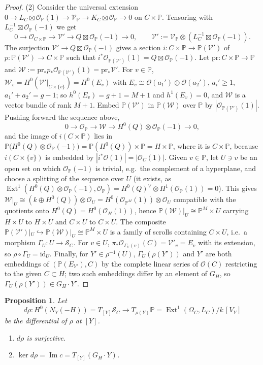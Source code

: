 \documentclass[11pt,reqno]{amsart}
\theoremstyle{plain}
\newtheorem{proposition}[theorem]{Proposition}
\theoremstyle{definition}
\newcommand{\PP}{\mathbb{P}}
\newcommand{\PM}{\mathbb{P}^M}
\newcommand{\OO}{\mathcal{O}}
\newcommand{\Ext}{\operatorname{Ext}}
\renewcommand{\Im}{\operatorname{Im}}
\newcommand{\id}{\mathrm{id}}
\newcommand{\NY}{N_{Y}}
\newcommand{\SC}{\mathcal{S}_C}
\newcommand{\GH}{G_H}
\begin{document}
\begin{proof}
(2) Consider the universal extension $0\to L_C\boxtimes\OO_{\PP}(1)\to\mathcal{V}_{\PP}\to K_C\boxtimes\OO_{\PP}\to0$ on $C\times\PP$. Tensoring with $L_C^{-1}\boxtimes\OO_{\PP}(-1)$ we get
\[
0\to\OO_{C\times\PP}\to\mathcal{V}'\to Q\boxtimes\OO_{\PP}(-1)\to0,\qquad \mathcal{V}':=\mathcal{V}_{\PP}\otimes(L_C^{-1}\boxtimes\OO_{\PP}(-1)).
\]
The surjection $\mathcal{V}'\to Q\boxtimes\OO_{\PP}(-1)$ gives a section $i\colon C\times\PP\to\PP(\mathcal{V}')$ of $p\colon\PP(\mathcal{V}')\to C\times\PP$ such that $i^*\OO_{\PP(\mathcal{V}')}(1)=Q\boxtimes\OO_{\PP}(-1)$. Let $\mathrm{pr}\colon C\times\PP\to\PP$ and $\mathcal{W}:=\mathrm{pr}_*p_*\OO_{\PP(\mathcal{V}')}(1)=\mathrm{pr}_*\mathcal{V}'$. For $v\in\PP$, $\mathcal{W}_v=H^0(\mathcal{V}'|_{C\times\{v\}})=H^0(E_v)$ with $E_v\cong\OO(a_1')\oplus\OO(a_2')$, $a_i'\ge1$, $a_1'+a_2'=g-1$; so $h^0(E_v)=g+1=M+1$ and $h^1(E_v)=0$, and $\mathcal{W}$ is a vector bundle of rank $M+1$. Embed $\PP(\mathcal{V}')$ in $\PP(\mathcal{W})$ over $\PP$ by $|\OO_{\PP(\mathcal{V}')}(1)|$. Pushing forward the sequence above,
\[
0\to\OO_{\PP}\to\mathcal{W}\to H^0(Q)\otimes\OO_{\PP}(-1)\to0,
\]
and the image of $i(C\times\PP)$ lies in $\PP\big(H^0(Q)\otimes\OO_{\PP}(-1)\big)=\PP(H^0(Q))\times\PP=H\times\PP$, where it is $C\times\PP$, because $i(C\times\{v\})$ is embedded by $|i^*\OO(1)|=|\OO_C(1)|$. Given $v\in\PP$, let $U\ni v$ be an open set on which $\OO_{\PP}(-1)$ is trivial, e.g.\ the complement of a hyperplane, and choose a splitting of the sequence over $U$ (it exists, as $\Ext^1(H^0(Q)\otimes\OO_{\PP}(-1),\OO_{\PP})=H^0(Q)^{\vee}\otimes H^1(\OO_{\PP}(1))=0$). This gives $\mathcal{W}|_U\cong(k\oplus H^0(Q))\otimes\OO_U=H^0(\OO_{\PM}(1))\otimes\OO_U$ compatible with the quotients onto $H^0(Q)=H^0(\OO_H(1))$, hence $\PP(\mathcal{W})|_U\cong\PM\times U$ carrying $H\times U$ to $H\times U$ and $C\times U$ to $C\times U$. The composite $\PP(\mathcal{V}')|_U\hookrightarrow\PP(\mathcal{W})|_U\cong\PM\times U$ is a family of scrolls containing $C\times U$, i.e.\ a morphism $\Gamma_U\colon U\to\SC$. For $v\in U$, $\pi_*\OO_{\Gamma_U(v)}(C)=\mathcal{V}'_v=E_v$ with its extension, so $\rho\circ\Gamma_U=\id_U$. Finally, for $Y'\in\rho^{-1}(U)$, $\Gamma_U(\rho(Y'))$ and $Y'$ are both embeddings of $(\PP(E_{Y'}),C)$ by the complete linear series of $\OO(C)$ restricting to the given $C\subset H$; two such embeddings differ by an element of $\GH$, so $\Gamma_U(\rho(Y'))\in\GH\cdot Y'$.
\end{proof}

\begin{proposition}\label{prop:drho}
Let
\[
d\rho\colon H^0(\NY(-H))=T_{[Y]}\SC\longrightarrow T_{\rho(Y)}\PP=\Ext^1(\Omega_C,L_C)/k\,[V_Y]
\]
be the differential of $\rho$ at $[Y]$.
\begin{enumerate}
\item $d\rho$ is surjective.
\item $\ker d\rho=\Im c=T_{[Y]}(\GH\cdot Y)$.
\end{enumerate}
\end{proposition}
\end{document}
